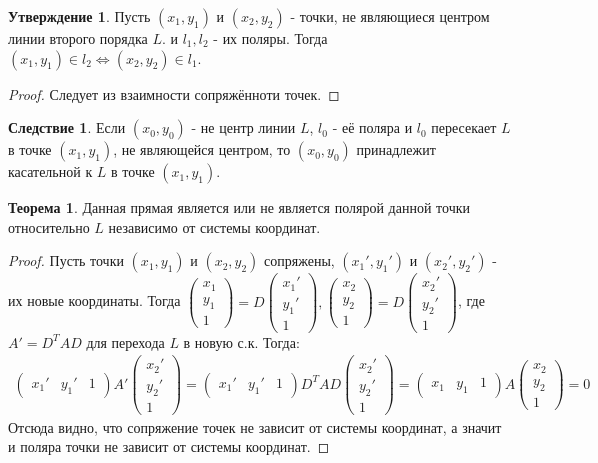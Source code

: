 \documentclass[a4paper, 12pt]{article}
\theoremstyle{definition}
\newtheorem*{theorem}{Теорема}
\newtheorem*{consequense}{Следствие}
\newtheorem*{subtheorem}{Утверждение}
\begin{document}
	\begin{subtheorem}
		Пусть $(x_1, y_1)$ и $(x_2, y_2)$ - точки, не являющиеся центром линии второго порядка $L$. и $l_1, l_2$ - их поляры. Тогда $(x_1, y_1) \in l_2 \Leftrightarrow (x_2, y_2) \in l_1$.
	\end{subtheorem}
	\begin{proof}
		Следует из взаимности сопряжённоти точек.
	\end{proof}
	\begin{consequense}
		Если $(x_0, y_0)$ - не центр линии $L$, $l_0$ - её поляра и $l_0$ пересекает $L$ в точке $(x_1, y_1)$, не являющейся центром, то $(x_0, y_0)$ принадлежит касательной к $L$ в точке $(x_1, y_1)$.
	\end{consequense}
	\begin{theorem}
		Данная прямая является или не является полярой данной точки относительно $L$ независимо от системы координат.
	\end{theorem}
	\begin{proof}
		Пусть точки $(x_1, y_1)$ и $(x_2, y_2)$ сопряжены, $(x_1', y_1')$ и $(x_2', y_2')$ - их новые координаты. Тогда $\begin{pmatrix} x_1  \\ y_1 \\ 1 \end{pmatrix} = D \begin{pmatrix} x_1'  \\ y_1' \\ 1 \end{pmatrix}, \begin{pmatrix} x_2  \\ y_2 \\ 1 \end{pmatrix} = D \begin{pmatrix} x_2'  \\ y_2' \\ 1 \end{pmatrix}$, где $A' = D^TAD$ для перехода $L$ в новую с.к. Тогда:\begin{align*}
		\begin{pmatrix} x_1'&y_1'&1 \end{pmatrix}A' \begin{pmatrix} x_2'  \\ y_2' \\ 1 \end{pmatrix} = \begin{pmatrix} x_1'&y_1'&1 \end{pmatrix}D^TAD\begin{pmatrix} x_2'  \\ y_2' \\ 1 \end{pmatrix} = \begin{pmatrix} x_1&y_1&1 \end{pmatrix}A \begin{pmatrix} x_2  \\ y_2 \\ 1 \end{pmatrix} = 0
		\end{align*}
		Отсюда видно, что сопряжение точек не зависит от системы координат, а значит и поляра точки не зависит от системы координат. 
	\end{proof}
\end{document}
